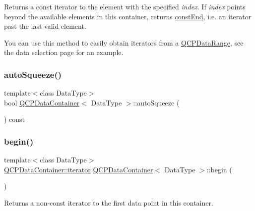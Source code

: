 Returns a const iterator to the element with the specified {\itshape index}. If {\itshape index} points beyond the available elements in this container, returns \hyperlink{class_q_c_p_data_container_aa7f7cf239b85b1a28de3d675cc5b3da1}{const\+End}, i.\+e. an iterator past the last valid element.

You can use this method to easily obtain iterators from a \hyperlink{class_q_c_p_data_range}{Q\+C\+P\+Data\+Range}, see the data selection page for an example. \mbox{\label{class_q_c_p_data_container_a64f0f1621ca46de2352eaf87476db9b1}} 
\subsubsection{\texorpdfstring{auto\+Squeeze()}{autoSqueeze()}}
{\footnotesize\ttfamily template$<$class Data\+Type$>$ \\
bool \hyperlink{class_q_c_p_data_container}{Q\+C\+P\+Data\+Container}$<$ Data\+Type $>$\+::auto\+Squeeze (\begin{DoxyParamCaption}{ }\end{DoxyParamCaption}) const\hspace{0.3cm}{\ttfamily [inline]}}

\mbox{\label{class_q_c_p_data_container_a80032518413ab8f418f7c81182fd06cb}} 
\subsubsection{\texorpdfstring{begin()}{begin()}}
{\footnotesize\ttfamily template$<$class Data\+Type$>$ \\
\hyperlink{class_q_c_p_data_container_a1bb453c3ae37d1ee5268878acb3a9d29}{Q\+C\+P\+Data\+Container\+::iterator} \hyperlink{class_q_c_p_data_container}{Q\+C\+P\+Data\+Container}$<$ Data\+Type $>$\+::begin (\begin{DoxyParamCaption}{ }\end{DoxyParamCaption})\hspace{0.3cm}{\ttfamily [inline]}}

Returns a non-\/const iterator to the first data point in this container.

